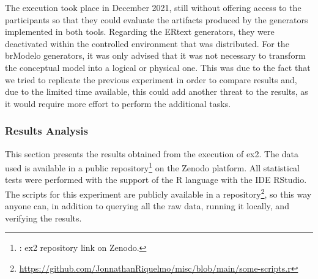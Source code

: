 The execution took place in December 2021, still without offering access to the participants so that they could evaluate the artifacts produced by the generators implemented in both tools.
Regarding the ERtext generators, they were deactivated within the controlled environment that was distributed.
For the brModelo generators, it was only advised that it was not necessary to transform the conceptual model into a logical or physical one.
This was due to the fact that we tried to replicate the previous experiment in order to compare results and, due to the limited time available, this could add another threat to the results, as it would require more effort to perform the additional tasks.

\subsubsection{Results Analysis}

This section presents the results obtained from the execution of \ac{ex2}.
The data used is available in a public repository\footnote{: ex2 repository link on Zenodo.} on the Zenodo platform.
All statistical tests were performed with the support of the R language with the IDE RStudio.
The scripts for this experiment are publicly available in a repository\footnote{\url{https://github.com/JonnathanRiquelmo/misc/blob/main/some-scripts.r}}, so this way anyone can, in addition to querying all the raw data, running it locally, and verifying the results.

